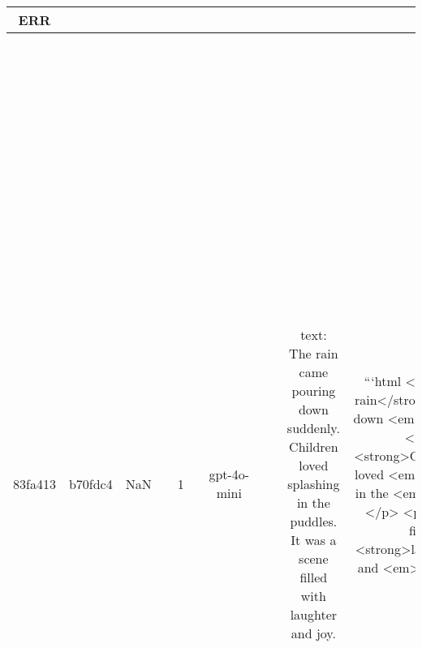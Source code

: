 \begin{table}[h!]
\begin{tabular}{|c|c|c|c|c|c|c|c|c|c|c|}
ERR\\
\hline
83fa413 & b70fdc4 & NaN &  & 1 & gpt-4o-mini &  & text: The rain came pouring down suddenly. Children loved splashing in the puddles. It was a scene filled with laughter and joy. & ```html
<p><strong>The rain</strong> came pouring down <em>suddenly</em>.</p>
<p><strong>Children</strong> loved <em>splashing</em> in the <em>puddles</em>.</p>
<p>It was a scene filled with <strong>laughter</strong> and <em>joy</em>.</p>
``` & ok & The chatbot's output includes three `<p>` tags, which satisfies the requirement of having at least three `<p>` tags. Inside each `<p>` tag, there is one `<strong>` tag, which meets the specification of including a `<strong>` tag in each sentence. Additionally, each `<p>` tag contains multiple `<em>` tags to emphasize key words or phrases, as observed with words such as "suddenly," "splashing," and "puddles." Therefore, the output complies with the description provided. 

OK\\
\hline
83fa413 & b70fdc4 & NaN &  & 1 & gemma2:9b &  & text: The rain came pouring down suddenly. Children loved splashing in the puddles. It was a scene filled with laughter and joy. & Here's the HTML formatting for the paragraph, with sentences wrapped in `<p>` tags and key words emphasized:

<p><strong>The</strong> rain came <em">pouring</em> down <em">suddenly</em>.</p> 
<p><strong>Children</strong> loved <em">splashing</em> in the <em">puddles</em>.</p>
<p>It was a scene filled with <strong">laughter</strong> and <emph>joy</emph>.</p>   


Let me know if you want to experiment with different ways to emphasize text within these sentences! & ok & The chatbot output is supposed to format a paragraph of text as HTML with each sentence wrapped in a `<p>` tag and include at least three `<p>` tags. Each `<p>` tag should also contain one `<strong>` tag and multiple `<em>` tags for emphasizing key words.

Upon examining the output:

1. There are three distinct `<p>` tags present, satisfying the requirement of at least three `<p>` tags.
2. Each `<p>` tag does indeed contain a `<strong>` tag, which meets the criterion of having at least one `<strong>` tag per paragraph.
3. However, there is a formatting error in the closing of the `<strong>` and `<em>` tags. The `</em>` closing tags are written as `<em"` and `</emph>`, and the `<strong>` tag in the last paragraph is opened wrongly as `<strong">`.
4. The incorrect syntax of the `<em>` and `<strong>` tags means it does not fully comply with the HTML standards as per the description, but checking full HTML correctness is outside the scope.


\end{tabular}
\end{table}
